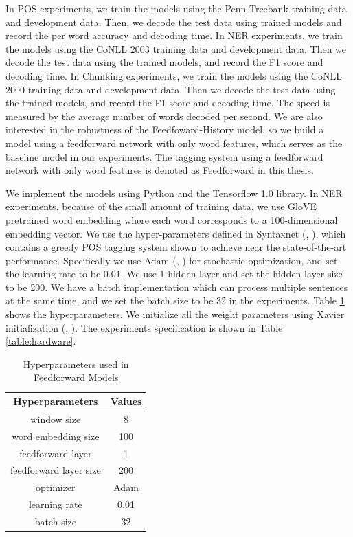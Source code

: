 In POS experiments, we train the models using the Penn Treebank training data and development data. Then, we decode the test data using trained models and record the per word accuracy and decoding time. In NER experiments, we train the models using the CoNLL 2003 training data and development data. Then we decode the test data using the trained models, and record the F1 score and decoding time. In Chunking experiments, we train the models using the CoNLL 2000 training data and development data. Then we decode the test data using the trained models, and record the F1 score and decoding time. The speed is measured by the average number of words decoded per second. We are also interested in the robustness of the Feedfoward-History model, so we build a model using a feedforward network with only word features, which serves as the baseline model in our experiments. The tagging system using a feedforward network with only word features is denoted as Feedforward in this thesis.

We implement the models using Python and the Tensorflow 1.0 library. In NER experiments, because of the small amount of training data, we use GloVE pretrained word embedding where each word corresponds to a 100-dimensional embedding vector. We use the hyper-parameters defined in Syntaxnet (\citeauthor{andor2016globally}, \citeyear{andor2016globally}), which contains a greedy POS tagging system shown to achieve near the state-of-the-art performance. Specifically we use Adam (\citeauthor{kingma2014adam}, \citeyear{kingma2014adam}) for stochastic optimization, and set the learning rate to be 0.01. We use 1 hidden layer and set the hidden layer size to be 200. We have a batch implementation which can process multiple sentences at the same time, and we set the batch size to be 32 in the experiments. Table \ref{table:hyperparameters1} shows the hyperparameters. We initialize all the weight parameters using Xavier initialization (\citeauthor{glorot2011domain}, \citeyear{glorot2011domain}). The experiments specification is shown in Table \ref{table:hardware}.

\begin{table}[]
\centering
\caption{Hyperparameters used in Feedforward Models}
\label{table:hyperparameters1}
\begin{tabular}{|c|c|}
\hline
Hyperparameters & Values \\ \hline
window size   & 8 \\ \hline
word embedding size & 100 \\ \hline
feedforward layer & 1 \\ \hline
feedforward layer size & 200 \\ \hline
optimizer & Adam \\ \hline
learning rate & 0.01 \\ \hline
batch size & 32 \\ \hline
\end{tabular}
\end{table}

